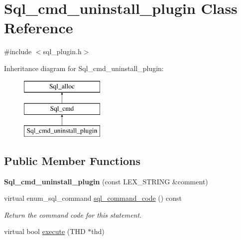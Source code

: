 \hypertarget{classSql__cmd__uninstall__plugin}{}\section{Sql\+\_\+cmd\+\_\+uninstall\+\_\+plugin Class Reference}
\label{classSql__cmd__uninstall__plugin}


{\ttfamily \#include $<$sql\+\_\+plugin.\+h$>$}

Inheritance diagram for Sql\+\_\+cmd\+\_\+uninstall\+\_\+plugin\+:\begin{figure}[H]
\begin{center}
\leavevmode
\includegraphics[height=3.000000cm]{classSql__cmd__uninstall__plugin}
\end{center}
\end{figure}
\subsection*{Public Member Functions}
\begin{DoxyCompactItemize}
\item 
\mbox{\label{classSql__cmd__uninstall__plugin_a44ead378e34879dc5779042750e83060}} 
{\bfseries Sql\+\_\+cmd\+\_\+uninstall\+\_\+plugin} (const L\+E\+X\+\_\+\+S\+T\+R\+I\+NG \&comment)
\item 
\mbox{\label{classSql__cmd__uninstall__plugin_a9a40b733787d700aa30fadfdb7d07cbc}} 
virtual enum\+\_\+sql\+\_\+command \mbox{\hyperlink{classSql__cmd__uninstall__plugin_a9a40b733787d700aa30fadfdb7d07cbc}{sql\+\_\+command\+\_\+code}} () const
\begin{DoxyCompactList}\small\item\em Return the command code for this statement. \end{DoxyCompactList}\item 
virtual bool \mbox{\hyperlink{classSql__cmd__uninstall__plugin_ad5aad6804dee065f60f1a57d01ced199}{execute}} (T\+HD $\ast$thd)
\end{DoxyCompactItemize}
